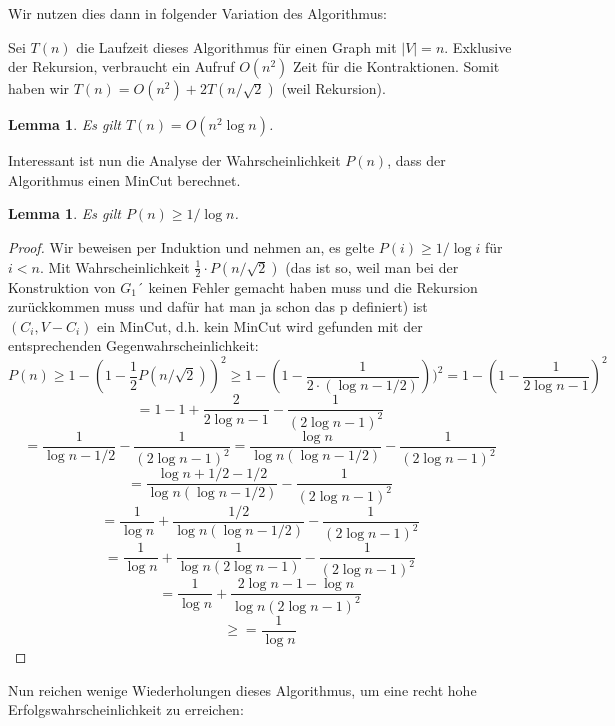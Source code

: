 \documentclass{article}
\newtheorem{lem}[thm]{Lemma}
\begin{document}
Wir nutzen dies dann in folgender Variation des Algorithmus:
\begin{algorithm}
	
\end{algorithm}

Sei $T(n)$ die Laufzeit dieses Algorithmus für einen Graph mit $|V|=n$. Exklusive der Rekursion, verbraucht ein Aufruf $O(n^2)$ Zeit für die Kontraktionen. Somit haben wir $T(n)=O(n^2)+ 2T(n/\sqrt{2})$ (weil Rekursion).
\begin{lem}
	Es gilt $T(n)=O(n^2 \log n)$.
\end{lem}
Interessant ist nun die Analyse der Wahrscheinlichkeit $P(n)$, dass der Algorithmus einen MinCut berechnet.
\begin{lem}
	Es gilt $P(n)\geq 1/\log n$.
\end{lem}
\begin{proof}

	Wir beweisen per Induktion und nehmen an, es gelte $P(i)\geq 1/\log i$ für $i<n$. Mit Wahrscheinlichkeit $\frac{1}{2}\cdot P(n/\sqrt{2})$  (das ist so, weil man bei der Konstruktion von $ G_1 ´$ keinen Fehler gemacht haben muss und die Rekursion zurückkommen muss und dafür hat man ja schon das p definiert) ist $(C_i, V-C_i)$ ein MinCut, d.h. kein MinCut wird gefunden mit der entsprechenden Gegenwahrscheinlichkeit:
	\[
		P(n)\geq 1- (1- \frac{1}{2}P(n/\sqrt{2}))^2 \geq  1-(1-\frac{1}{2\cdot (\log n - 1/2)}))^2= 1- (1-\frac{1}{2\log n -1})^2 
	\]
	\[
		=1 - 1 + \frac{2}{2\log n -1} - \frac{1}{(2\log n -1)^2}
	\]
	\[
		=\frac{1}{\log n -1/2} - \frac{1}{(2\log n -1)^2} =\frac{\log n }{\log n(\log n -1/2)} - \frac{1}{(2\log n -1)^2} 
	\]
	\[
		=\frac{\log n +1/2 - 1/2}{\log n(\log n -1/2)} - \frac{1}{(2\log n -1)^2} 
	\]
	\[
		=\frac{1}{\log n} + \frac{1/2}{\log n(\log n -1/2)} - \frac{1}{(2\log n -1)^2} 
	\]
	\[
		=\frac{1}{\log n} + \frac{1}{\log n(2\log n -1)} - \frac{1}{(2\log n -1)^2} 
	\]
	\[
		=\frac{1}{\log n} + \frac{2\log n -1-\log n}{\log n(2\log n -1)^2} 
	\]
	\[
		\geq =\frac{1}{\log n} 
	\]
\end{proof}

Nun reichen wenige Wiederholungen dieses Algorithmus, um eine recht hohe Erfolgswahrscheinlichkeit zu erreichen:
\end{document}

